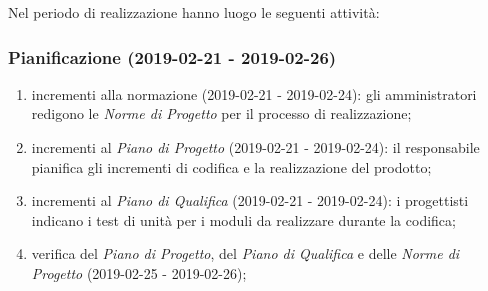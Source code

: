 Nel periodo di realizzazione hanno luogo le seguenti attività:
		\subsubsection{Pianificazione (2019-02-21 - 2019-02-26)}
			\begin{enumerate}[label= 4.1.\arabic*)]
				\item incrementi alla normazione (2019-02-21 - 2019-02-24): gli amministratori redigono le \textit{Norme di Progetto} per il processo di realizzazione;
				\item incrementi al \textit{Piano di Progetto} (2019-02-21 - 2019-02-24): il responsabile pianifica gli incrementi di codifica e la realizzazione del prodotto;
				\item incrementi al \textit{Piano di Qualifica} (2019-02-21 - 2019-02-24): i progettisti indicano i test di unità per i moduli da realizzare durante la codifica;
				\item verifica del \textit{Piano di Progetto}, del \textit{Piano di Qualifica} e delle \textit{Norme di Progetto} (2019-02-25 - 2019-02-26);
			\end{enumerate}
